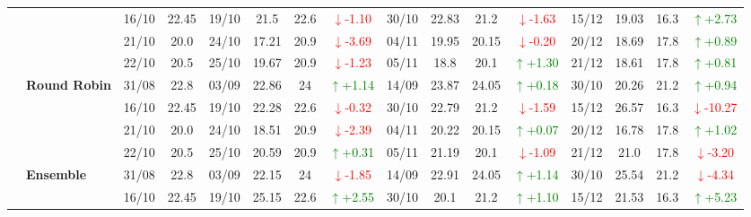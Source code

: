 {\begin{longtable}{llcc|cccc|cccc|cccc}
& 
& 16/10 & 22.45 & 19/10 & 21.5 & 22.6 & \textcolor{red}{\(\downarrow\)-1.10} & 30/10 & 22.83 & 21.2 & \textcolor{red}{\(\downarrow\)-1.63} & 15/12 & 19.03 & 16.3 & \textcolor{green}{\(\uparrow\)+2.73} \\

& 
& 21/10 & 20.0 & 24/10 & 17.21 & 20.9 & \textcolor{red}{\(\downarrow\)-3.69} & 04/11 & 19.95 & 20.15 & \textcolor{red}{\(\downarrow\)-0.20} & 20/12 & 18.69 & 17.8 & \textcolor{green}{\(\uparrow\)+0.89} \\

&
& 22/10 & 20.5 & 25/10 & 19.67 & 20.9 & \textcolor{red}{\(\downarrow\)-1.23} & 05/11 & 18.8 & 20.1 & \textcolor{green}{\(\uparrow\)+1.30} & 21/12 & 18.61 & 17.8 & \textcolor{green}{\(\uparrow\)+0.81} \\
\cmidrule(lr){2-16}


& \textbf{Round Robin}
& 31/08 & 22.8 & 03/09 & 22.86 & 24 & \textcolor{green}{\(\uparrow\)+1.14} & 14/09 & 23.87 & 24.05 & \textcolor{green}{\(\uparrow\)+0.18} & 30/10 & 20.26 & 21.2 & \textcolor{green}{\(\uparrow\)+0.94} \\

&
& 16/10 & 22.45 & 19/10 & 22.28 & 22.6 & \textcolor{red}{\(\downarrow\)-0.32} & 30/10 & 22.79 & 21.2 & \textcolor{red}{\(\downarrow\)-1.59} & 15/12 & 26.57 & 16.3 & \textcolor{red}{\(\downarrow\)-10.27} \\

&
& 21/10 & 20.0 & 24/10 & 18.51 & 20.9 & \textcolor{red}{\(\downarrow\)-2.39} & 04/11 & 20.22 & 20.15 & \textcolor{green}{\(\uparrow\)+0.07} & 20/12 & 16.78 & 17.8 & \textcolor{green}{\(\uparrow\)+1.02} \\

&
& 22/10 & 20.5 & 25/10 & 20.59 & 20.9 & \textcolor{green}{\(\uparrow\)+0.31} & 05/11 & 21.19 & 20.1 & \textcolor{red}{\(\downarrow\)-1.09} & 21/12 & 21.0 & 17.8 & \textcolor{red}{\(\downarrow\)-3.20} \\
\cmidrule(lr){2-16}


& \textbf{Ensemble}
& 31/08 & 22.8 & 03/09 & 22.15 & 24 & \textcolor{red}{\(\downarrow\)-1.85} & 14/09 & 22.91 & 24.05 & \textcolor{green}{\(\uparrow\)+1.14} & 30/10 & 25.54 & 21.2 & \textcolor{red}{\(\downarrow\)-4.34} \\

&
& 16/10 & 22.45 & 19/10 & 25.15 & 22.6 & \textcolor{green}{\(\uparrow\)+2.55} & 30/10 & 20.1 & 21.2 & \textcolor{green}{\(\uparrow\)+1.10} & 15/12 & 21.53 & 16.3 & \textcolor{green}{\(\uparrow\)+5.23} \\


\end{longtable}}
